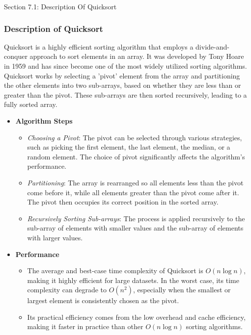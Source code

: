 \begin{notes}{Section 7.1: Description Of Quicksort}
    \subsubsection*{Description of Quicksort}

    Quicksort is a highly efficient sorting algorithm that employs a divide-and-conquer approach to sort elements in an array. It was developed by Tony Hoare in 1959 and has since become one of the 
    most widely utilized sorting algorithms. Quicksort works by selecting a 'pivot' element from the array and partitioning the other elements into two sub-arrays, based on whether they are less than 
    or greater than the pivot. These sub-arrays are then sorted recursively, leading to a fully sorted array.
    
    \begin{itemize}
        \item \textbf{Algorithm Steps}
        \begin{itemize}
            \item \emph{Choosing a Pivot}: The pivot can be selected through various strategies, such as picking the first element, the last element, the median, or a random element. The choice of 
            pivot significantly affects the algorithm's performance.
            \item \emph{Partitioning}: The array is rearranged so all elements less than the pivot come before it, while all elements greater than the pivot come after it. The pivot then occupies its 
            correct position in the sorted array.
            \item \emph{Recursively Sorting Sub-arrays}: The process is applied recursively to the sub-array of elements with smaller values and the sub-array of elements with larger values.
        \end{itemize}
        
        \item \textbf{Performance}
        \begin{itemize}
            \item The average and best-case time complexity of Quicksort is $O(n \log n)$, making it highly efficient for large datasets. In the worst case, its time complexity can degrade to $O(n^2)$, 
            especially when the smallest or largest element is consistently chosen as the pivot.
            \item Its practical efficiency comes from the low overhead and cache efficiency, making it faster in practice than other $O(n \log n)$ sorting algorithms.
        \end{itemize}
        

\end{itemize}
\end{notes}
